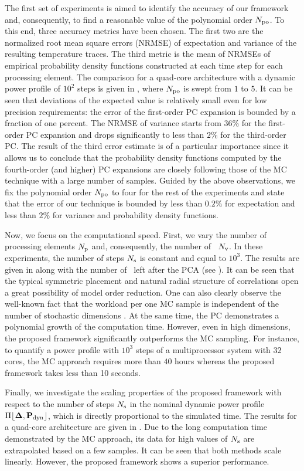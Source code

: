 
The first set of experiments is aimed to identify the accuracy of our framework and, consequently, to find a reasonable value of the polynomial order ${N_\text{po}}$. To this end, three accuracy metrics have been chosen. The first two are the normalized root mean square errors (NRMSE) of expectation and variance of the resulting temperature traces. The third metric is the mean of NRMSEs of empirical probability density functions constructed at each time step for each processing element. The comparison for a quad-core architecture with a dynamic power profile of $10^2$ steps is given in , where ${N_\text{po}}$ is swept from $1$ to $5$. It can be seen that deviations of the expected value is relatively small even for low precision requirements: the error of the first-order PC expansion is bounded by a fraction of one percent. The NRMSE of variance starts from $36\%$ for the first-order PC expansion and drops significantly to less than $2\%$ for the third-order PC. The result of the third error estimate is of a particular importance since it allows us to conclude that the probability density functions computed by the fourth-order (and higher) PC expansions are closely following those of the MC technique with a large number of samples. Guided by the above observations, we fix the polynomial order ${N_\text{po}}$ to four for the rest of the experiments and state that the error of our technique is bounded by less than $0.2\%$ for expectation and less than $2\%$ for variance and probability density functions.


Now, we focus on the computational speed. First, we vary the number of processing elements ${N_\text{p}}$ and, consequently, the number of \rvs\ ${N_\text{v}}$. In these experiments, the number of steps $N_\text{s}$ is constant and equal to $10^3$. The results are given in  along with the number of \rvs\ left after the PCA (see ). It can be seen that the typical symmetric placement and natural radial structure of correlations \cite{cheng2011} open a great possibility of model order reduction. One can also clearly observe the well-known fact that the workload per one MC sample is independent of the number of stochastic dimensions \cite{maitre2010}. At the same time, the PC demonstrates a polynomial growth \cite{heiss2008} of the computation time. However, even in high dimensions, the proposed framework significantly outperforms the MC sampling. For instance, to quantify a power profile with $10^3$ steps of a multiprocessor system with $32$ cores, the MC approach requires more than $40$ hours whereas the proposed framework takes less than 10 seconds.

Finally, we investigate the scaling properties of the proposed framework with respect to the number of steps $N_\text{s}$ in the nominal dynamic power profile $\profPdyn$, which is directly proportional to the simulated time. The results for a quad-core architecture are given in . Due to the long computation time demonstrated by the MC approach, its data for high values of $N_\text{s}$ are extrapolated based on a few samples. It can be seen that both methods scale linearly. However, the proposed framework shows a superior performance.
